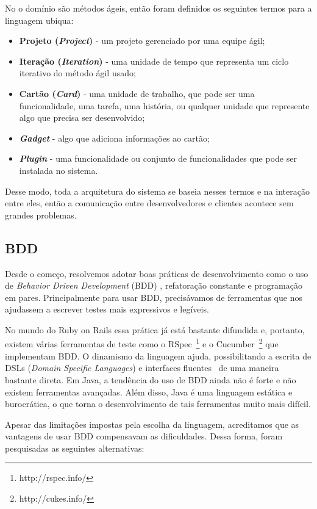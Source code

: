 No \calopsita{} o domínio são métodos ágeis, então foram definidos os seguintes termos para a linguagem ubíqua:

\begin{itemize}
	\item{\textbf{Projeto (\textit{Project})} - um projeto gerenciado por uma equipe ágil;}
	\item{\textbf{Iteração (\textit{Iteration})} - uma unidade de tempo que representa um ciclo iterativo do método ágil usado;}
	\item{\textbf{Cartão (\textit{Card})} - uma unidade de trabalho, que pode ser uma funcionalidade, uma tarefa, uma história, ou qualquer unidade que represente algo que precisa ser desenvolvido;}
	\item{\textbf{\textit{Gadget}} - algo que adiciona informações ao cartão;}
	\item{\textbf{\textit{Plugin}} - uma funcionalidade ou conjunto de funcionalidades que pode ser instalada no sistema.}
\end{itemize}

Desse modo, toda a arquitetura do sistema se baseia nesses termos e na interação entre eles, então a comunicação entre desenvolvedores e clientes acontece sem grandes problemas.

\subsection{BDD} 
\label{bdd}

Desde o começo, resolvemos adotar boas práticas de desenvolvimento como o uso de \textit{Behavior Driven Development} (BDD) \cite{bdd}, refatoração constante e programação em pares. Principalmente para usar BDD, precisávamos de ferramentas que nos ajudassem a escrever testes mais expressivos e legíveis. 

No mundo do Ruby on Rails essa prática já está bastante difundida e, portanto, existem várias ferramentas de teste como o RSpec~\footnote{http://rspec.info/} e o Cucumber~\footnote{http://cukes.info/} que implementam BDD. O dinamismo da linguagem ajuda, possibilitando a escrita de DSLs (\textit{Domain Specific Languages}) e interfaces fluentes~\cite{dsl} de uma maneira bastante direta. Em Java, a tendência do uso de BDD ainda não é forte e não existem ferramentas avançadas. Além disso, Java é uma linguagem estática e burocrática, o que torna o desenvolvimento de tais ferramentas muito mais difícil. 

Apesar das limitações impostas pela escolha da linguagem, acreditamos que as vantagens de usar BDD compensavam as dificuldades. Dessa forma, foram pesquisadas as seguintes alternativas:

